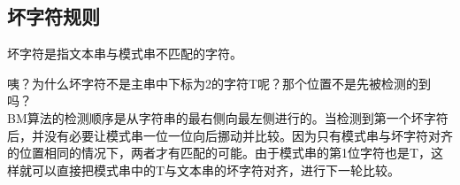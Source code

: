 \vspace{0.5cm}

\subsection{坏字符规则}

坏字符是指文本串与模式串不匹配的字符。

\begin{table}[H]
	\centering
\end{table}

咦？为什么坏字符不是主串中下标为2的字符T呢？那个位置不是先被检测的到吗？\\

BM算法的检测顺序是从字符串的最右侧向最左侧进行的。当检测到第一个坏字符后，并没有必要让模式串一位一位向后挪动并比较。因为只有模式串与坏字符对齐的位置相同的情况下，两者才有匹配的可能。由于模式串的第1位字符也是T，这样就可以直接把模式串中的T与文本串的坏字符对齐，进行下一轮比较。

